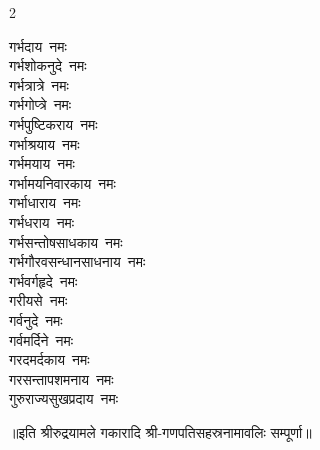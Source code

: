 \begin{multicols}{2}
\begin{flushleft}
गर्भदाय~नमः\\
गर्भशोकनुदे~नमः\\
गर्भत्रात्रे~नमः\\
गर्भगोप्त्रे~नमः\\
गर्भपुष्टिकराय~नमः\\
गर्भाश्रयाय~नमः\\
गर्भमयाय~नमः\\
गर्भामयनिवारकाय~नमः\\
गर्भाधाराय~नमः\hfill{}\\
गर्भधराय~नमः\\
गर्भसन्तोषसाधकाय~नमः\\
गर्भगौरवसन्धानसाधनाय~नमः\\
गर्भवर्गहृदे~नमः\\
गरीयसे~नमः\\
गर्वनुदे~नमः\\
गर्वमर्दिने~नमः\\
गरदमर्दकाय~नमः\\
गरसन्तापशमनाय~नमः\\
गुरुराज्यसुखप्रदाय~नमः\hfill{}\\
\end{flushleft}
\end{multicols}
\centerline{॥इति श्रीरुद्रयामले गकारादि श्री-गणपतिसहस्रनामावलिः सम्पूर्णा॥}
